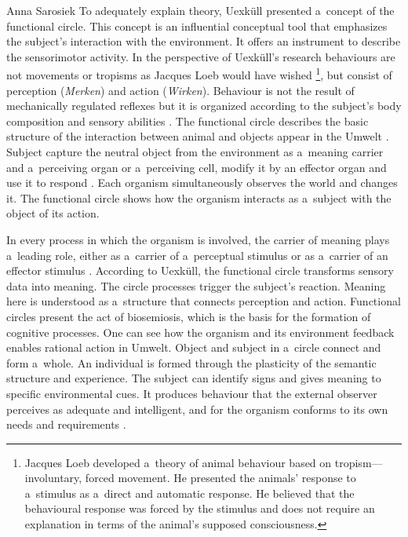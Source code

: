 \begin{artengenv}{Anna Sarosiek}
To adequately explain theory, Uexküll presented a~concept of the functional circle. This concept is an influential conceptual tool that emphasizes the subject’s interaction with the environment. It offers an instrument to describe the sensorimotor activity. In the perspective of Uexküll’s research behaviours are not movements or tropisms as Jacques Loeb would have wished
\parencite[][pp.151–156]{loeb_concerning_1907}%
\footnote{Jacques Loeb developed a~theory of animal behaviour based on tropism---involuntary, forced movement. He presented the animals’ response to a~stimulus as a~direct and automatic response. He believed that the behavioural response was forced by the stimulus and does not require an explanation in terms of the animal’s supposed consciousness.}, but consist of perception (\textit{Merken}) and action (\textit{Wirken}). Behaviour is not the result of mechanically regulated reflexes but it is organized according to the subject's body composition and sensory abilities 
\parencite[][p.26]{uexkull_theory_1982}. %
 The functional circle describes the basic structure of the interaction between animal and objects appear in the Umwelt 
\parencite[][p.27]{uexkull_streifzuge_1934}. %
 Subject capture the neutral object from the environment as a~meaning carrier and a~perceiving organ or a~perceiving cell, modify it by an effector organ and use it to respond 
\parencite[][p.170]{uexkull_sign_1987}. %
 Each organism simultaneously observes the world and changes it. The functional circle shows how the organism interacts as a~subject with the object of its action.

In every process in which the organism is involved, the carrier of meaning plays a~leading role, either as a~carrier of a~perceptual stimulus or as a~carrier of an effector stimulus
\parencite[][]{uexkull_theory_1982}. %
 According to Uexküll, the functional circle transforms sensory data into meaning. The circle processes trigger the subject’s reaction. Meaning here is understood as a~structure that connects perception and action. Functional circles present the act of biosemiosis, which is the basis for the formation of cognitive processes. One can see how the organism and its environment feedback enables rational action in Umwelt. Object and subject in a~circle connect and form a~whole. An individual is formed through the plasticity of the semantic structure and experience. The subject can identify signs and gives meaning to specific environmental cues. It produces behaviour that the external observer perceives as adequate and intelligent, and for the organism conforms to its own needs and requirements 
\parencite[][pp.28–29]{uexkull_streifzuge_1934}.%



\end{artengenv}
